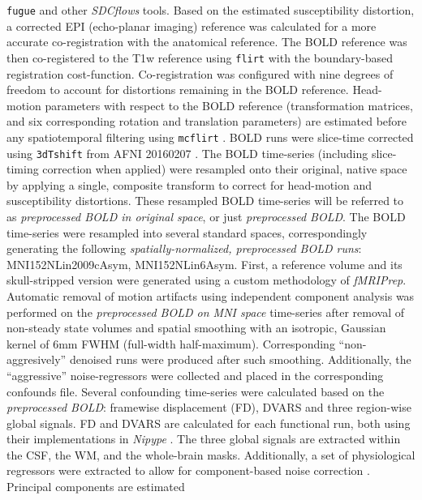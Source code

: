 \documentclass[]{article}
\begin{document}
\begin{description}
\texttt{fugue} and other \emph{SDCflows} tools. Based on the estimated
susceptibility distortion, a corrected EPI (echo-planar imaging)
reference was calculated for a more accurate co-registration with the
anatomical reference. The BOLD reference was then co-registered to the
T1w reference using \texttt{flirt} \citep[FSL 5.0.9,][]{flirt} with the
boundary-based registration \citep{bbr} cost-function. Co-registration
was configured with nine degrees of freedom to account for distortions
remaining in the BOLD reference. Head-motion parameters with respect to
the BOLD reference (transformation matrices, and six corresponding
rotation and translation parameters) are estimated before any
spatiotemporal filtering using \texttt{mcflirt} \citep[FSL
5.0.9,][]{mcflirt}. BOLD runs were slice-time corrected using
\texttt{3dTshift} from AFNI 20160207 \citep[RRID:SCR\_005927]{afni}. The
BOLD time-series (including slice-timing correction when applied) were
resampled onto their original, native space by applying a single,
composite transform to correct for head-motion and susceptibility
distortions. These resampled BOLD time-series will be referred to as
\emph{preprocessed BOLD in original space}, or just \emph{preprocessed
BOLD}. The BOLD time-series were resampled into several standard spaces,
correspondingly generating the following \emph{spatially-normalized,
preprocessed BOLD runs}: MNI152NLin2009cAsym, MNI152NLin6Asym. First, a
reference volume and its skull-stripped version were generated using a
custom methodology of \emph{fMRIPrep}. Automatic removal of motion
artifacts using independent component analysis
\citep[ICA-AROMA,][]{aroma} was performed on the \emph{preprocessed BOLD
on MNI space} time-series after removal of non-steady state volumes and
spatial smoothing with an isotropic, Gaussian kernel of 6mm FWHM
(full-width half-maximum). Corresponding ``non-aggresively'' denoised
runs were produced after such smoothing. Additionally, the
``aggressive'' noise-regressors were collected and placed in the
corresponding confounds file. Several confounding time-series were
calculated based on the \emph{preprocessed BOLD}: framewise displacement
(FD), DVARS and three region-wise global signals. FD and DVARS are
calculated for each functional run, both using their implementations in
\emph{Nipype} \citep[following the definitions by][]{power_fd_dvars}.
The three global signals are extracted within the CSF, the WM, and the
whole-brain masks. Additionally, a set of physiological regressors were
extracted to allow for component-based noise correction
\citep[\emph{CompCor},][]{compcor}. Principal components are estimated

\end{description}
\end{document}
